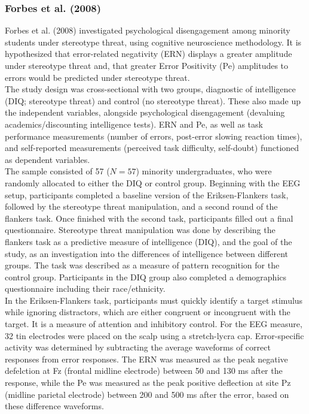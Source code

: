 \documentclass[
  stu]{apa7}
\begin{document}
\subsubsection{Forbes et al. (2008)}\label{forbesroledevaluingdiscounting2008}

Forbes et al. (2008) investigated psychological disengagement among minority students under stereotype threat, using cognitive neuroscience methodology.
It is hypothesized that error-related negativity (ERN) displays a greater amplitude under stereotype threat and, that greater Error Positivity (Pe) amplitudes to errors would be predicted under stereotype threat.\\
The study design was cross-sectional with two groups, diagnostic of intelligence (DIQ; stereotype threat) and control (no stereotype threat).
These also made up the independent variables, alongside psychological disengagement (devaluing academics/discounting intelligence tests). ERN and Pe, as well as task performance measurements (number of errors, post-error slowing reaction times), and self-reported measurements (perceived task difficulty, self-doubt) functioned as dependent variables.\\
The sample consisted of 57 (\(N = 57\)) minority undergraduates, who were randomly allocated to either the DIQ or control group.
Beginning with the EEG setup, participants completed a baseline version of the Eriksen-Flankers task, followed by the stereotype threat manipulation, and a second round of the flankers task.
Once finished with the second task, participants filled out a final questionnaire.
Stereotype threat manipulation was done by describing the flankers task as a predictive measure of intelligence (DIQ), and the goal of the study, as an investigation into the differences of intelligence between different groups.
The task was described as a measure of pattern recognition for the control group.
Participants in the DIQ group also completed a demographics questionnaire including their race/ethnicity.\\
In the Eriksen-Flankers task, participants must quickly identify a target stimulus while ignoring distractors, which are either congruent or incongruent with the target.
It is a measure of attention and inhibitory control.
For the EEG measure, 32 tin electrodes were placed on the scalp using a stretch-lycra cap.
Error-specific activity was determined by subtracting the average waveforms of correct responses from error responses.
The ERN was measured as the peak negative defelction at Fz (frontal midline electrode) between 50 and 130 ms after the response, while the Pe was measured as the peak positive deflection at site Pz (midline parietal electrode) between 200 and 500 ms after the error, based on these difference waveforms.
\end{document}
